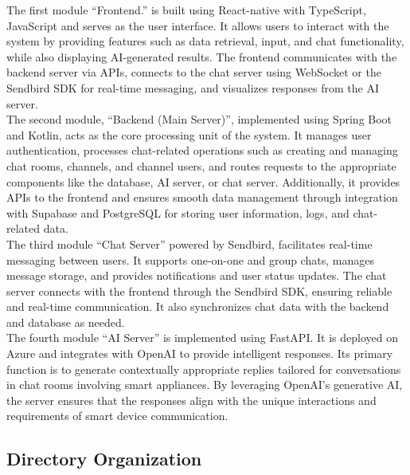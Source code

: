 \documentclass[conference]{IEEEtran}
\begin{document}
\begin{enumerate}
\begin{itemize}
\begin{itemize}
\begin{enumerate}
\hspace{0.7em} The first module “Frontend.”  is built using React-native with TypeScript, JavaScript and serves as the user interface. It allows users to interact with the system by providing features such as data retrieval, input, and chat functionality, while also displaying AI-generated results. The frontend communicates with the backend server via APIs, connects to the chat server using WebSocket or the Sendbird SDK for real-time messaging, and visualizes responses from the AI server. \\


\hspace{0.7em} The second module, “Backend (Main Server)”, implemented using Spring Boot and Kotlin, acts as the core processing unit of the system. It manages user authentication, processes chat-related operations such as creating and managing chat rooms, channels, and channel users, and routes requests to the appropriate components like the database, AI server, or chat server. Additionally, it provides APIs to the frontend and ensures smooth data management through integration with Supabase and PostgreSQL for storing user information, logs, and chat-related data. \\

\hspace{0.7em} The third module “Chat Server” powered by Sendbird, facilitates real-time messaging between users. It supports one-on-one and group chats, manages message storage, and provides notifications and user status updates. The chat server connects with the frontend through the Sendbird SDK, ensuring reliable and real-time communication. It also synchronizes chat data with the backend and database as needed. \\ 

The fourth module “AI Server” is implemented using FastAPI. It is deployed on Azure and integrates with OpenAI to provide intelligent responses. Its primary function is to generate contextually appropriate replies tailored for conversations in chat rooms involving smart appliances. By leveraging OpenAI's generative AI, the server ensures that the responses align with the unique interactions and requirements of smart device communication. \\

\subsection{Directory Organization}


\end{enumerate}
\end{itemize}
\end{itemize}
\end{enumerate}
\end{document}
